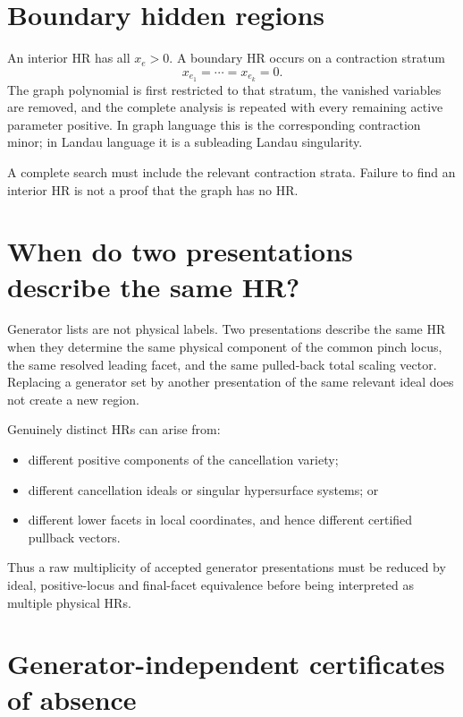 \documentclass[a4paper,11pt]{article}
\begin{document}
\section{Boundary hidden regions}
\label{sec:boundary}

An interior HR has all \(x_e>0\).  A boundary HR occurs on a contraction
stratum
\begin{equation}
 x_{e_1}=\cdots=x_{e_k}=0.
\end{equation}
The graph polynomial is first restricted to that stratum, the vanished
variables are removed, and the complete analysis is repeated with every
remaining active parameter positive.  In graph language this is the
corresponding contraction minor; in Landau language it is a subleading
Landau singularity.

A complete search must include the relevant contraction strata.  Failure to
find an interior HR is not a proof that the graph has no HR.

\section{When do two presentations describe the same HR?}
\label{sec:equivalence}

Generator lists are not physical labels.  Two presentations describe the
same HR when they determine the same physical component of the common pinch
locus, the same resolved leading facet, and the same pulled-back total
scaling vector.  Replacing a generator set by another presentation of the
same relevant ideal does not create a new region.

Genuinely distinct HRs can arise from:
\begin{itemize}
\item different positive components of the cancellation variety;
\item different cancellation ideals or singular hypersurface systems; or
\item different lower facets in local coordinates, and hence different
      certified pullback vectors.
\end{itemize}
Thus a raw multiplicity of accepted generator presentations must be reduced
by ideal, positive-locus and final-facet equivalence before being interpreted
as multiple physical HRs.

\section{Generator-independent certificates of absence}
\label{sec:absence}
\end{document}
